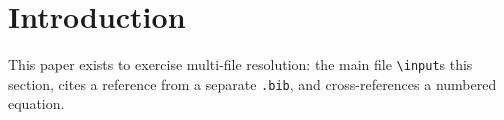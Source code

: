 \section{Introduction}
This paper exists to exercise multi-file resolution: the main file
\texttt{\textbackslash input}s this section, cites a reference from a
separate \texttt{.bib}, and cross-references a numbered equation.
